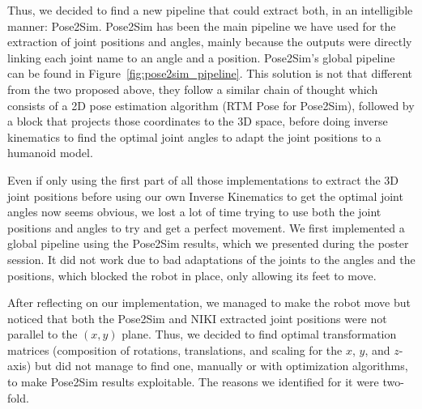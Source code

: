 \documentclass{amsart}
\theoremstyle{definition}
\theoremstyle{plain}
\begin{document}
Thus, we decided to find a new pipeline that could extract both, in an intelligible manner: Pose2Sim\cite{Pose2Sim}. Pose2Sim has been the main pipeline we have used for the extraction of joint positions and angles, mainly because the outputs were directly linking each joint name to an angle and a position. Pose2Sim's global pipeline can be found in Figure~\ref{fig:pose2sim_pipeline}. This solution is not that different from the two proposed above, they follow a similar chain of thought which consists of a 2D pose estimation algorithm (RTM Pose\cite{RTMPose} for Pose2Sim), followed by a block that projects those coordinates to the 3D space, before doing inverse kinematics to find the optimal joint angles to adapt the joint positions to a humanoid model. 

Even if only using the first part of all those implementations to extract the 3D joint positions before using our own Inverse Kinematics to get the optimal joint angles now seems obvious, we lost a lot of time trying to use both the joint positions and angles to try and get a perfect movement. We first implemented a global pipeline using the Pose2Sim results, which we presented during the poster session. It did not work due to bad adaptations of the joints to the angles and the positions, which blocked the robot in place, only allowing its feet to move. 

After reflecting on our implementation, we managed to make the robot move but noticed that both the Pose2Sim and NIKI extracted joint positions were not parallel to the $(x, y)$ plane. Thus, we decided to find optimal transformation matrices (composition of rotations, translations, and scaling for the $x$, $y$, and $z$-axis) but did not manage to find one, manually or with optimization algorithms, to make Pose2Sim results exploitable. The reasons we identified for it were two-fold.
\end{document}
